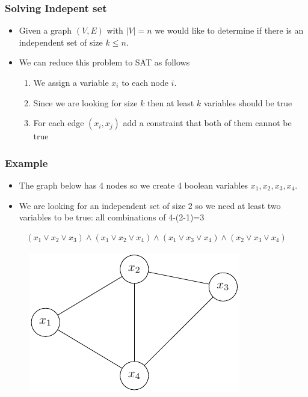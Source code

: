 \documentclass{beamer}
\begin{document}
\begin{frame}
  \frametitle{Solving Indepent set}
  \begin{itemize}
  \item Given a graph $(V,E)$ with $\lvert V\rvert=n$ we would like to determine if there is an independent set of size $k\le n$.
  \item We can reduce this problem to SAT as follows
    \begin{enumerate}
    \item We assign a variable $x_i$ to each node $i$.
    \item Since we are looking for size $k$ then at least $k$ variables should be true
   \item For each edge $(x_i,x_j)$ add a constraint that both of them cannot be true
    \end{enumerate}
  \end{itemize}
\end{frame}
\begin{frame}
  \frametitle{Example}
  \begin{itemize}
  \item The graph below has 4 nodes so we create 4 boolean variables $x_1,x_2,x_3,x_4$.
  \item We are looking for an independent set of size 2 so we need at least two variables to be true: all combinations of 4-(2-1)=3
  \end{itemize}
  \begin{align*}
    (x_1\vee x_2\vee x_3)\wedge (x_1\vee x_2\vee x_4)\wedge (x_1\vee x_3\vee x_4)\wedge (x_2\vee x_3\vee x_4)
  \end{align*}
  \begin{figure}[h]
    \centering
\includegraphics{np-figs/independent2}
  \end{figure}
\end{frame}
\end{document}
